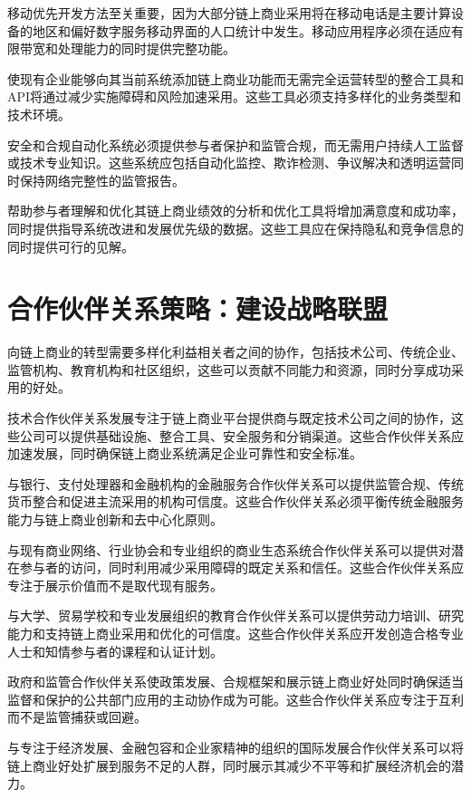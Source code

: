\documentclass[
  Letterpaper,
]{scrbook}
\begin{document}
移动优先开发方法至关重要，因为大部分链上商业采用将在移动电话是主要计算设备的地区和偏好数字服务移动界面的人口统计中发生。移动应用程序必须在适应有限带宽和处理能力的同时提供完整功能。

使现有企业能够向其当前系统添加链上商业功能而无需完全运营转型的整合工具和API将通过减少实施障碍和风险加速采用。这些工具必须支持多样化的业务类型和技术环境。

安全和合规自动化系统必须提供参与者保护和监管合规，而无需用户持续人工监督或技术专业知识。这些系统应包括自动化监控、欺诈检测、争议解决和透明运营同时保持网络完整性的监管报告。

帮助参与者理解和优化其链上商业绩效的分析和优化工具将增加满意度和成功率，同时提供指导系统改进和发展优先级的数据。这些工具应在保持隐私和竞争信息的同时提供可行的见解。

\section{合作伙伴关系策略：建设战略联盟}\label{ux5408ux4f5cux4f19ux4f34ux5173ux7cfbux7b56ux7565ux5efaux8bbeux6218ux7565ux8054ux76df}

向链上商业的转型需要多样化利益相关者之间的协作，包括技术公司、传统企业、监管机构、教育机构和社区组织，这些可以贡献不同能力和资源，同时分享成功采用的好处。

技术合作伙伴关系发展专注于链上商业平台提供商与既定技术公司之间的协作，这些公司可以提供基础设施、整合工具、安全服务和分销渠道。这些合作伙伴关系应加速发展，同时确保链上商业系统满足企业可靠性和安全标准。

与银行、支付处理器和金融机构的金融服务合作伙伴关系可以提供监管合规、传统货币整合和促进主流采用的机构可信度。这些合作伙伴关系必须平衡传统金融服务能力与链上商业创新和去中心化原则。

与现有商业网络、行业协会和专业组织的商业生态系统合作伙伴关系可以提供对潜在参与者的访问，同时利用减少采用障碍的既定关系和信任。这些合作伙伴关系应专注于展示价值而不是取代现有服务。

与大学、贸易学校和专业发展组织的教育合作伙伴关系可以提供劳动力培训、研究能力和支持链上商业采用和优化的可信度。这些合作伙伴关系应开发创造合格专业人士和知情参与者的课程和认证计划。

政府和监管合作伙伴关系使政策发展、合规框架和展示链上商业好处同时确保适当监督和保护的公共部门应用的主动协作成为可能。这些合作伙伴关系应专注于互利而不是监管捕获或回避。

与专注于经济发展、金融包容和企业家精神的组织的国际发展合作伙伴关系可以将链上商业好处扩展到服务不足的人群，同时展示其减少不平等和扩展经济机会的潜力。
\end{document}
